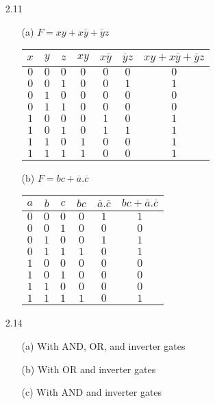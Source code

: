 \documentclass{article}
\begin{document}
\begin{itemize}
	\item [2.11]
	\begin{itemize}
		\item [(a)] $F = xy + x\overline{y} + \overline{y}z$\\
		\begin{tabular}{c | c | c | c | c | c | c}
		$x$ & $y$ & $z$ & $xy$ & $x\overline{y}$ & $\overline{y}z$ & $xy + x\overline{y} + \overline{y}z$\\ \hline
		$0$ & $0$ & $0$ & $0$ & $0$ & $0$ & $0$ \\
		$0$ & $0$ & $1$ & $0$ & $0$ & $1$ & $1$ \\
		$0$ & $1$ & $0$ & $0$ & $0$ & $0$ & $0$ \\
		$0$ & $1$ & $1$ & $0$ & $0$ & $0$ & $0$ \\
		$1$ & $0$ & $0$ & $0$ & $1$ & $0$ & $1$ \\
		$1$ & $0$ & $1$ & $0$ & $1$ & $1$ & $1$ \\
		$1$ & $1$ & $0$ & $1$ & $0$ & $0$ & $1$ \\
		$1$ & $1$ & $1$ & $1$ & $0$ & $0$ & $1$ \\
		\end{tabular}
		\item [(b)] $F = bc + \overline{a}.\overline{c}$\\
		\begin{tabular}{c | c | c | c | c | c}
		$a$ & $b$ & $c$ & $bc$ & $\overline{a}.\overline{c}$ & $bc + \overline{a}.\overline{c}$\\ \hline
		$0$ & $0$ & $0$ & $0$ & $1$ & $1$ \\
		$0$ & $0$ & $1$ & $0$ & $0$ & $0$ \\
		$0$ & $1$ & $0$ & $0$ & $1$ & $1$ \\
		$0$ & $1$ & $1$ & $1$ & $0$ & $1$ \\
		$1$ & $0$ & $0$ & $0$ & $0$ & $0$ \\
		$1$ & $0$ & $1$ & $0$ & $0$ & $0$ \\
		$1$ & $1$ & $0$ & $0$ & $0$ & $0$ \\
		$1$ & $1$ & $1$ & $1$ & $0$ & $1$ \\
		\end{tabular}
	\end{itemize}

	\item [2.14]
	\begin{itemize}
		\item [(a)] With AND, OR, and inverter gates
		\item [(b)] With OR and inverter gates
		\item [(c)] With AND and inverter gates
	\end{itemize}

\end{itemize}

	
\end{document}
